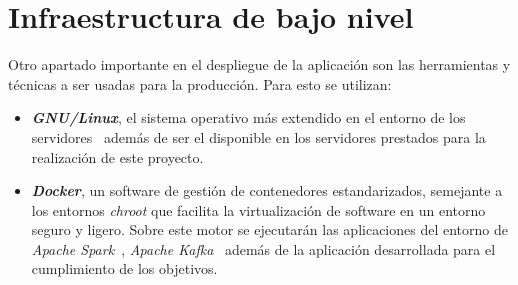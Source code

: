 \section{Infraestructura de bajo nivel}

Otro apartado importante en el despliegue de la aplicación son las herramientas y técnicas a ser usadas para la producción. Para esto se utilizan:

\begin{itemize}
	\item \textit{\textbf{GNU/Linux}}, el sistema operativo más extendido en el entorno de los servidores~\cite{noauthorred2018, zhang2000linux} además de ser el disponible en los servidores prestados para la realización de este proyecto.
	\item \textit{\textbf{Docker}}, un software de gestión de contenedores estandarizados, semejante a los entornos \textit{chroot} que facilita la virtualización de software en un entorno seguro y ligero. Sobre este motor se ejecutarán las aplicaciones del entorno de \textit{Apache Spark}~\cite{juez2019docker}, \textit{Apache Kafka}~\cite{wurstmeister2019kafka} además de la aplicación desarrollada para el cumplimiento de los objetivos.
\end{itemize}
